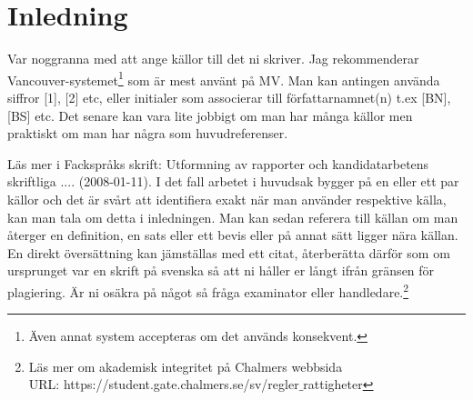 \documentclass[../rapport_MVEX01-11-05]{subfiles}
\begin{document}
\section{Inledning}
Var noggranna med att ange källor till det ni skriver. Jag
rekommenderar Vancouver-systemet\footnote{Även annat system accepteras
om det används konsekvent.} som är mest använt på MV. Man kan antingen
använda siffror [1], [2] etc, eller initialer som associerar till
författarnamnet(n) t.ex [BN], [BS] etc. Det senare kan vara lite
jobbigt om man har många källor men praktiskt om man har några som
huvudreferenser.

Läs mer i Fackspråks skrift: Utformning av rapporter och
kandidatarbetens skriftliga .... (2008-01-11)\cite{rapp}.
I det fall arbetet i huvudsak bygger på en eller ett par källor och
det är svårt att identifiera exakt när man använder respektive källa,
kan man tala om detta i inledningen. Man kan sedan referera till
källan om man återger en definition, en sats eller ett bevis eller på
annat sätt ligger nära källan. En direkt översättning kan jämställas
med ett citat, återberätta därför som om ursprunget var en skrift på
svenska så att ni håller er långt ifrån gränsen för plagiering. Är ni
osäkra på något så fråga examinator eller handledare.\footnote{Läs mer
om akademisk integritet på Chalmers webbsida \hfill \\ URL:
https://student.gate.chalmers.se/sv/regler$\_$rattigheter}
\end{document}
